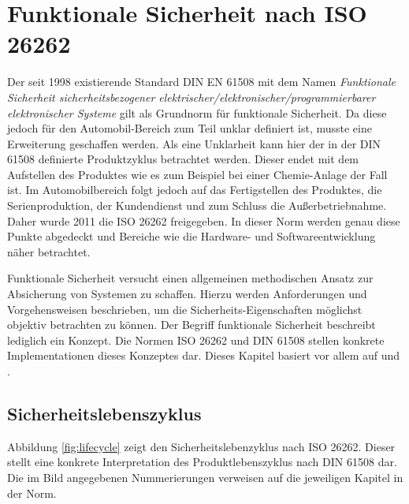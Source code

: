 \documentclass[
  a4paper,					    %
  twoside,
  DIV=calc,     				%
  bibliography=totoc,
  cleardoublepage=empty,
  ngerman,     					%
  final       					%
]{scrbook}
\begin{document}
\section{Funktionale Sicherheit nach ISO 26262}
\label{sec:Sicherheit}
Der seit 1998 existierende Standard DIN EN 61508 mit dem Namen \emph{Funktionale Sicherheit sicherheitsbezogener elektrischer/elektronischer/programmierbarer elektronischer Systeme} gilt als Grundnorm für funktionale Sicherheit. Da diese jedoch für den Automobil-Bereich zum Teil unklar definiert ist, musste eine Erweiterung geschaffen werden. Als eine Unklarheit kann hier der in der DIN 61508 definierte Produktzyklus betrachtet werden. Dieser endet mit dem Aufstellen des Produktes wie es zum Beispiel bei einer Chemie-Anlage der Fall ist. Im Automobilbereich folgt jedoch auf das Fertigstellen des Produktes, die Serienproduktion, der Kundendienst und zum Schluss die Außerbetriebnahme. Daher wurde 2011 die ISO 26262 freigegeben. In dieser Norm werden genau diese Punkte abgedeckt und Bereiche wie die Hardware- und Softwareentwicklung näher betrachtet.

Funktionale Sicherheit versucht einen allgemeinen methodischen Ansatz zur Absicherung von Systemen zu schaffen. Hierzu werden Anforderungen und Vorgehensweisen beschrieben, um die Sicherheits-Eigenschaften möglichst objektiv betrachten zu können. Der Begriff funktionale Sicherheit beschreibt lediglich ein Konzept. Die Normen ISO 26262 und DIN 61508 stellen konkrete Implementationen dieses Konzeptes dar. Dieses Kapitel basiert vor allem auf \cite{iso26262} und \cite{iso26262_robuste}.

\subsection{Sicherheitslebenszyklus}
\label{sec:ISO26262_lebenszyklus}

Abbildung \ref{fig:lifecycle} zeigt den Sicherheitslebenzyklus nach ISO 26262. Dieser stellt eine konkrete Interpretation des Produktlebenszyklus nach DIN 61508 dar. Die im Bild angegebenen Nummerierungen verweisen auf die jeweiligen Kapitel in der Norm. 
\end{document}
